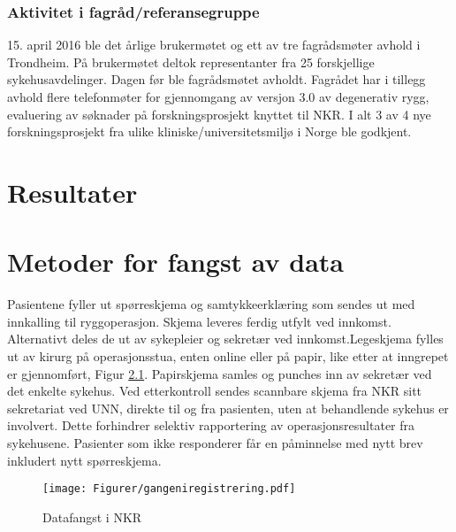 \documentclass[norsk, a4paper, twocolumn]{report}
\begin{document}
\subsection{Aktivitet i fagråd/referansegruppe}
15. april 2016 ble det årlige brukermøtet og ett av tre fagrådsmøter avhold i Trondheim. På brukermøtet deltok representanter fra 25 forskjellige sykehusavdelinger. Dagen før ble fagrådsmøtet avholdt. Fagrådet har i tillegg avhold flere telefonmøter for gjennomgang av versjon 3.0 av degenerativ rygg, evaluering av søknader på forskningsprosjekt knyttet til NKR. I alt 3 av 4 nye forskningsprosjekt fra ulike kliniske/universitetsmiljø i Norge ble godkjent.





\chapter{Resultater}\label{cha:res}






\chapter{Metoder for fangst av data}\label{cha:metoder}
Pasientene fyller ut spørreskjema og samtykkeerklæring som sendes ut med innkalling til ryggoperasjon. Skjema leveres ferdig utfylt ved innkomst. Alternativt deles de ut av sykepleier og sekretær ved innkomst.Legeskjema fylles ut av kirurg på operasjonsstua, enten online eller på papir, like etter at inngrepet er gjennomført, Figur \ref{fig:gangeniregistrering}. Papirskjema samles og punches inn av sekretær ved det enkelte sykehus. Ved etterkontroll sendes scannbare skjema fra NKR sitt sekretariat ved UNN, direkte til og fra pasienten, uten at behandlende sykehus er involvert. Dette forhindrer selektiv rapportering av operasjonsresultater fra sykehusene. Pasienter som ikke responderer får en påminnelse med nytt brev inkludert nytt spørreskjema. 

\begin{figure}[ht]
\texttt{[image: Figurer/gangeniregistrering.pdf]}
\caption{Datafangst i NKR}
\label{fig:gangeniregistrering}
\end{figure}
\end{document}
